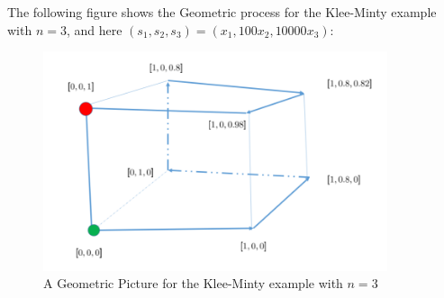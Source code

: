 The following figure shows the Geometric process for the Klee-Minty example with $n=3$, and here $(s_1,s_2,s_3) = (x_1,100x_2,10000x_3)$:
\begin{figure}[H]
\centering
\includegraphics[width=0.9\textwidth]{Third_lecture/p_1}
\caption{A Geometric Picture for the Klee-Minty example with $n=3$}
\end{figure}








